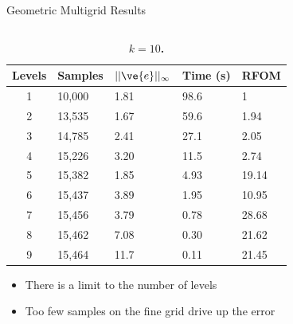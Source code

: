 \documentclass{beamer}
\begin{document}
\begin{frame}{Geometric Multigrid Results}
\begin{columns}
\begin{column}{0.5\textwidth}
      { \tiny
        \begin{table}[h!]
          \begin{center}
            \begin{tabular}{cllll}\hline\hline
              \multicolumn{1}{c}{\textbf{Levels}} & 
              \multicolumn{1}{l}{\textbf{Samples}} & 
              \multicolumn{1}{l}{\textbf{$||\ve{e}||_{\infty}$}} & 
              \multicolumn{1}{l}{\textbf{Time (s)}} & 
              \multicolumn{1}{l}{\textbf{RFOM}} \\
              \hline
              1 & 10,000 & 1.81 & 98.6 & 1 \\
              2 & 13,535 & 1.67 & 59.6 & 1.94 \\
              3 & 14,785 & 2.41 & 27.1 & 2.05 \\
              4 & 15,226 & 3.20 & 11.5 & 2.74 \\
              5 & 15,382 & 1.85 & 4.93 & 19.14 \\
              6 & 15,437 & 3.89 & 1.95 & 10.95 \\
              7 & 15,456 & 3.79 & 0.78 & 28.68 \\
              8 & 15,462 & 7.08 & 0.30 & 21.62 \\
              9 & 15,464 & 11.7 & 0.11 & 21.45 \\
              \hline\hline
            \end{tabular}
          \end{center}
          \caption{\textbf{$k = 10$.}}
          \label{tab:k10_results}
        \end{table}
      }

      \vspace{-0.25in}

      \begin{itemize}
      \item There is a limit to the number of levels
      \item Too few samples on the fine grid drive up the error
      \end{itemize}

    \end{column}

  \end{columns}

\end{frame}
\end{document}

